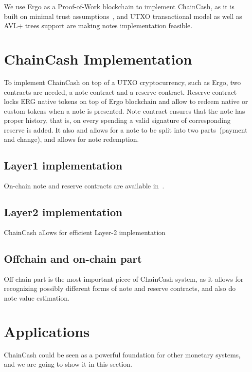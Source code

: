 \documentclass{article}   %
\newcommand{\authnote}[2]{\marginpar{\parbox{\marginparwidth}{\tiny %
  \textsf{#1 {\textcolor{blue}{notes: #2}}}}}%
  \textcolor{blue}{\textbf{\dag}}}
\newcommand{\authnote}[2]{
  \textsf{#1 \textcolor{blue}{: #2}}}
\newcommand{\authnote}[2]{}
\newcommand{\knote}[1]{{\authnote{\textcolor{green}{kushti notes}}{#1}}}
\newcommand{\cc}{ChainCash}
\begin{document}
We use Ergo as a Proof-of-Work blockchain to implement \cc{}, as it is built on minimal trust assumptions~\cite{kya}, and UTXO transactional model as well as AVL+ trees support are making notes implementation feasible.


\section{\cc{} Implementation}

To implement \cc{} on top of a UTXO cryptocurrency, such as Ergo, two contracts are needed, a note contract and a reserve contract. Reserve contract locks ERG native tokens on top of Ergo blockchain and allow to redeem native or custom tokens when a note is presented. Note contract ensures that the note has proper history, that is, on every spending a valid signature of corresponding reserve is added. It also and allows for a note to be split into two parts~(payment and change), and allows for note redemption.

\subsection{Layer1 implementation}
\label{sec:l1-impl}

On-chain note and reserve contracts are available in~\cite{contracts}.


\subsection{Layer2 implementation}

\cc{} allows for efficient Layer-2 implementation \knote{finish}


\subsection{Offchain and on-chain part}

Off-chain part is the most important piece of \cc{} system, as it allows for recognizing possibly different forms of note and reserve contracts, and also do note value estimation. 


\section{Applications}

\cc{} could be seen as a powerful foundation for other monetary systems, and we are going to show it in this section. 
\end{document}
